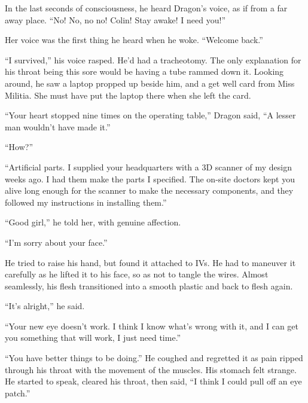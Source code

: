 In the last seconds of consciousness, he heard Dragon's voice, as if from a far away place.  ``No!  No, no no!  Colin!  Stay awake!  I need you!''



\sectionbreak



Her voice was the first thing he heard when he woke.  ``Welcome back.''



``I survived,'' his voice rasped.  He'd had a tracheotomy.  The only explanation for his throat being this sore would be having a tube rammed down it.  Looking around, he saw a laptop propped up beside him, and a get well card from Miss Militia.  She must have put the laptop there when she left the card.



``Your heart stopped nine times on the operating table,'' Dragon said, ``A lesser man wouldn't have made it.''



``How?''



``Artificial parts.  I supplied your headquarters with a 3D scanner of my design weeks ago.  I had them make the parts I specified.  The on-site doctors kept you alive long enough for the scanner to make the necessary components, and they followed my instructions in installing them.''



``Good girl,'' he told her, with genuine affection.



``I'm sorry about your face.''



He tried to raise his hand, but found it attached to IVs.  He had to maneuver it carefully as he lifted it to his face, so as not to tangle the wires.  Almost seamlessly, his flesh transitioned into a smooth plastic and back to flesh again.



``It's alright,'' he said.



``Your new eye doesn't work.  I think I know what's wrong with it, and I can get you something that will work, I just need time.''



``You have better things to be doing.''  He coughed and regretted it as pain ripped through his throat with the movement of the muscles.  His stomach felt strange.  He started to speak, cleared his throat, then said,  ``I think I could pull off an eye patch.''



